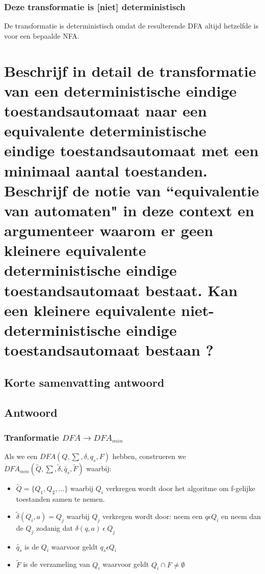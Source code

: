\documentclass{article}
\begin{document}
            \subsubsection{Deze transformatie is [niet] deterministisch}
                De transformatie is deterministisch omdat de resulterende DFA altijd hetzelfde is voor een bepaalde NFA.
                

\newpage
\section{Beschrijf in detail de transformatie van een deterministische eindige toestandsautomaat naar een equivalente deterministische eindige toestandsautomaat met een minimaal aantal toestanden. Beschrijf de notie van ``equivalentie van automaten" in deze context en argumenteer waarom er geen kleinere equivalente deterministische eindige toestandsautomaat bestaat. Kan een kleinere equivalente niet-deterministische eindige toestandsautomaat bestaan ?}
    \subsection{Korte samenvatting antwoord}

    \subsection{Antwoord}
        \subsubsection{Tranformatie $DFA \rightarrow DFA_{min}$}
            Als we een $DFA(Q,\sum,\delta,q_s,F)$ hebben, construeren we $DFA_{min}(\tilde{Q}, \sum, \tilde{\delta}, \tilde{q_s}, \tilde{F})$ waarbij:
            \begin{itemize}
                \item $\tilde{Q} = \{Q_1, Q_2,...\}$ waarbij $Q_i$ verkregen wordt door het algoritme om f-gelijke toestanden samen te nemen.
                \item $\tilde{\delta}(Q_i, a) = Q_j$ waarbij $Q_j$ verkregen wordt door: neem een $q \epsilon Q_i$ en neem dan de $Q_j$ zodanig dat $\delta(q,a)\ \epsilon \ Q_j$
                \item $\tilde{q_s}$ is de $Q_i$ waarvoor geldt $q_s \epsilon Q_i$
                \item $\tilde{F}$ is de verzameling van $Q_i$ waarvoor geldt $Q_i \cap F \neq \emptyset$ 
            \end{itemize}
\end{document}
